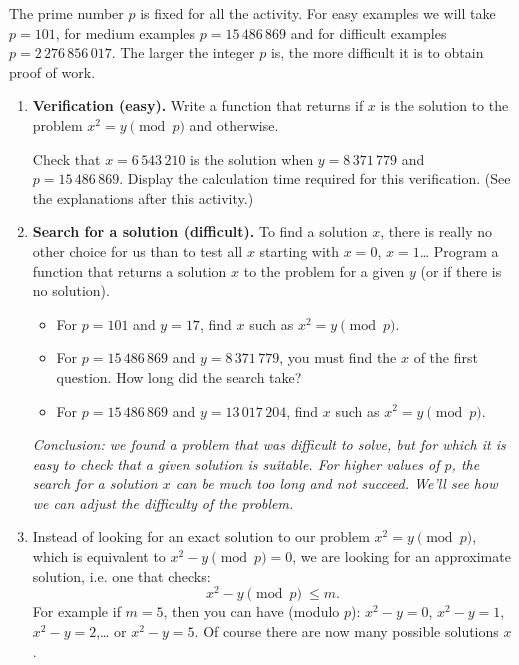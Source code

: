 \documentclass[11pt,class=report,crop=false]{standalone}
\begin{document}
\begin{activite}
The prime number $p$ is fixed for all the activity. 
For easy examples we will take $p = 101$, for medium examples $p = 15\,486\,869$ and for difficult examples $p = 2\,276\,856\,017$. The larger the integer $p$ is, the more difficult it is to obtain proof of work.

\begin{enumerate}
  \item \textbf{Verification (easy).} 
  Write a  function that returns  if $x$ is the solution to the problem $x^2 = y \pmod{p}$ and  otherwise.
  
  Check that $x = 6\,543\,210$ is the solution when $y = 8\,371\,779$ and $p = 15\,486\,869$. Display the calculation time required for this verification. (See the explanations after this activity.)
  
  \item \textbf{Search for a solution (difficult).} To find a solution $x$, there is really no other choice for us than to test all $x$ starting with $x=0$, $x=1$\ldots{}
Program a  function that returns a solution $x$ to the problem for a given $y$ (or  if there is no solution).

  \begin{itemize}
    \item For $p = 101$ and $y=17$, find $x$ such as $x^2 = y \pmod{p}$. 
    \item For $p = 15\,486\,869$ and $y = 8\,371\,779$, you must find the $x$ of the first question. How long did the search take? 
    
    \item For $p = 15\,486\,869$ and $y = 13\,017\,204$, find $x$ such as $x^2 = y \pmod{p}$.    
   \end{itemize}


\medskip

\emph{Conclusion: we found a problem that was difficult to solve, but for which it is easy to check that a given solution is suitable. For higher values of $p$, the search for a solution $x$ can be much too long and not succeed. We'll see how we can adjust the difficulty of the problem.}


	\item Instead of looking for an exact solution to our problem $x^2 = y \pmod{p}$, which is equivalent to $x^2-y \pmod{p} = 0$, we are looking for an approximate solution, i.e. one that checks: $$x^2 - y \pmod{p} \ \le m.$$
	For example if $m=5$, then you can have (modulo $p$): $x^2 - y = 0$, $x^2 - y = 1$,
	$x^2-y = 2$,\ldots{} or $x^2-y=5$. 
	Of course there are now many possible solutions $x$.
	

\end{enumerate}
\end{activite}
\end{document}
